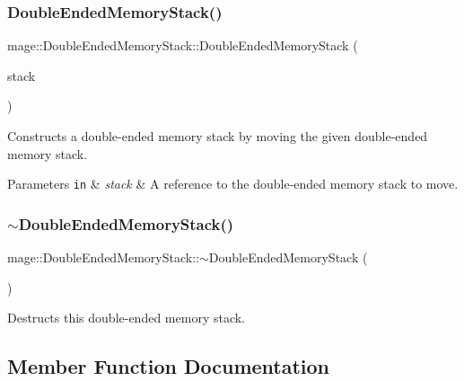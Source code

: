 \subsubsection{\texorpdfstring{Double\+Ended\+Memory\+Stack()}{DoubleEndedMemoryStack()}\hspace{0.1cm}{\footnotesize\ttfamily [3/3]}}
{\footnotesize\ttfamily mage\+::\+Double\+Ended\+Memory\+Stack\+::\+Double\+Ended\+Memory\+Stack (\begin{DoxyParamCaption}\item[{\hyperlink{classmage_1_1_double_ended_memory_stack}{Double\+Ended\+Memory\+Stack} \&\&}]{stack }\end{DoxyParamCaption})\hspace{0.3cm}{\ttfamily [default]}}

Constructs a double-\/ended memory stack by moving the given double-\/ended memory stack.


\begin{DoxyParams}[1]{Parameters}
\mbox{\tt in}  & {\em stack} & A reference to the double-\/ended memory stack to move. \\
\hline
\end{DoxyParams}
\hypertarget{classmage_1_1_double_ended_memory_stack_afaac4a28ea1e386bc83d3e07fd5531a0}{}\label{classmage_1_1_double_ended_memory_stack_afaac4a28ea1e386bc83d3e07fd5531a0} 
\subsubsection{\texorpdfstring{$\sim$\+Double\+Ended\+Memory\+Stack()}{~DoubleEndedMemoryStack()}}
{\footnotesize\ttfamily mage\+::\+Double\+Ended\+Memory\+Stack\+::$\sim$\+Double\+Ended\+Memory\+Stack (\begin{DoxyParamCaption}{ }\end{DoxyParamCaption})}

Destructs this double-\/ended memory stack. 

\subsection{Member Function Documentation}
\hypertarget{classmage_1_1_double_ended_memory_stack_a214b9ca245038c0441d15a5062d6c5f5}{}\label{classmage_1_1_double_ended_memory_stack_a214b9ca245038c0441d15a5062d6c5f5} 
